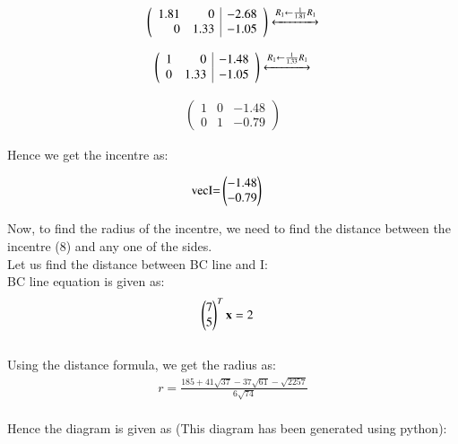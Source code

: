 \documentclass[journal,12pt,twocolumn]{IEEEtran}
\theoremstyle{remark}
\begin{document}
\begin{align*}
	\left(
		\begin{array}{rr|r}
			1.81 & 0 & -2.68\\
			0& 1.33 & -1.05
		\end{array}
	\right)
	\xleftrightarrow[]{R_{1} \leftarrow \frac{1}{1.81} R_{1} }
\end{align*}

\begin{align*}
	\left(
		\begin{array}{rr|r}
			1 & 0 & -1.48\\
			0& 1.33 & -1.05
		\end{array}
	\right)
	\xleftrightarrow[]{R_{1} \leftarrow \frac{1}{1.33} R_{1} }
\end{align*}

\begin{align*}
	\left(
		\begin{array}{rr|r}
			1 & 0 & -1.48\\
			0& 1 & -0.79
		\end{array}
	\right)
\end{align*}

\begin{flushleft}
	Hence we get the incentre as:
\end{flushleft}

\begin{align}
	\text{vec{I}=}&\begin{pmatrix}
		-1.48 \\
		-0.79
	\end{pmatrix}
\end{align}

\begin{flushleft}
    Now, to find the radius of the incentre, we need to find the distance between 
    the incentre (8) and any one of the sides. 
    \\
    Let us find the distance between BC line and I:
    \\
    BC line equation is given as:
    \bigskip
    \begin{align}
    &\begin{pmatrix}
        7 \\
        5
	\end{pmatrix}^{T}	
    \mathbf {x} = 2
    \end{align}
    \\
    Using the distance formula, we get the radius as:
    \\
    \begin{align}
    r = \frac{185+41\sqrt{37}-37\sqrt{61}-\sqrt{2257}}{6\sqrt{74}}
    \end{align}
    \\Hence the diagram is given as (This diagram has been generated using python):
    \\
\end{flushleft}
\end{document}
